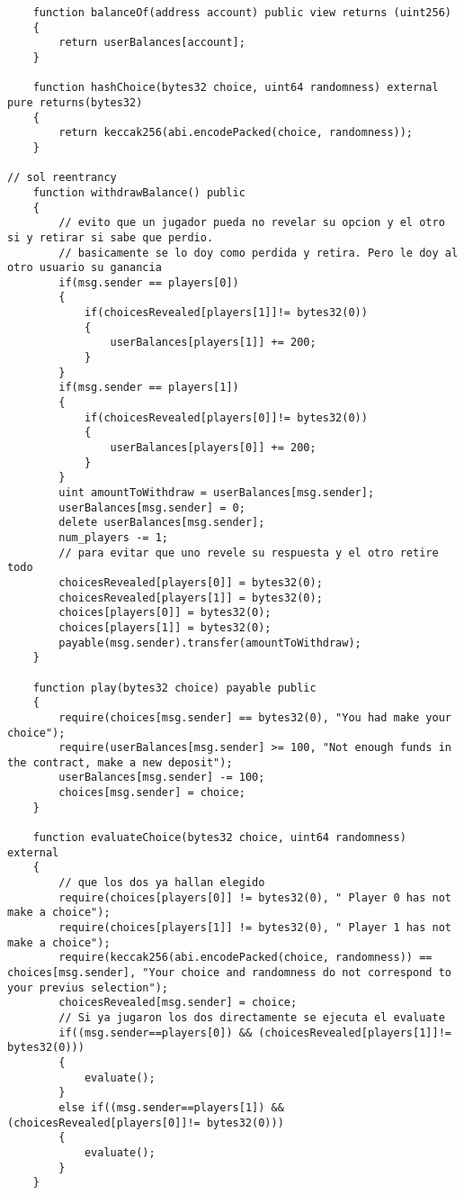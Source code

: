 \documentclass[12pt,addpoints,answers]{exam}
\begin{document}
\begin{questions}
\begin{verbatim}
    function balanceOf(address account) public view returns (uint256)
    {
        return userBalances[account];
    }

    function hashChoice(bytes32 choice, uint64 randomness) external pure returns(bytes32)
    {
        return keccak256(abi.encodePacked(choice, randomness));
    }

// sol reentrancy
    function withdrawBalance() public
    {
        // evito que un jugador pueda no revelar su opcion y el otro si y retirar si sabe que perdio.
        // basicamente se lo doy como perdida y retira. Pero le doy al otro usuario su ganancia
        if(msg.sender == players[0])
        {
            if(choicesRevealed[players[1]]!= bytes32(0))
            {
                userBalances[players[1]] += 200;
            }
        }
        if(msg.sender == players[1])
        {
            if(choicesRevealed[players[0]]!= bytes32(0))
            {
                userBalances[players[0]] += 200;
            }
        }
        uint amountToWithdraw = userBalances[msg.sender];
        userBalances[msg.sender] = 0;
        delete userBalances[msg.sender];
        num_players -= 1;
        // para evitar que uno revele su respuesta y el otro retire todo
        choicesRevealed[players[0]] = bytes32(0);
        choicesRevealed[players[1]] = bytes32(0);
        choices[players[0]] = bytes32(0);
        choices[players[1]] = bytes32(0);
        payable(msg.sender).transfer(amountToWithdraw);
    }

    function play(bytes32 choice) payable public
    {
        require(choices[msg.sender] == bytes32(0), "You had make your choice");
        require(userBalances[msg.sender] >= 100, "Not enough funds in the contract, make a new deposit");
        userBalances[msg.sender] -= 100;
        choices[msg.sender] = choice;
    }

    function evaluateChoice(bytes32 choice, uint64 randomness) external
    {
        // que los dos ya hallan elegido
        require(choices[players[0]] != bytes32(0), " Player 0 has not make a choice");
        require(choices[players[1]] != bytes32(0), " Player 1 has not make a choice");
        require(keccak256(abi.encodePacked(choice, randomness)) == choices[msg.sender], "Your choice and randomness do not correspond to your previus selection");
        choicesRevealed[msg.sender] = choice;
        // Si ya jugaron los dos directamente se ejecuta el evaluate
        if((msg.sender==players[0]) && (choicesRevealed[players[1]]!= bytes32(0)))
        {
            evaluate();
        }
        else if((msg.sender==players[1]) && (choicesRevealed[players[0]]!= bytes32(0)))
        {
            evaluate();
        }
    }


\end{verbatim}
\end{questions}
\end{document}
